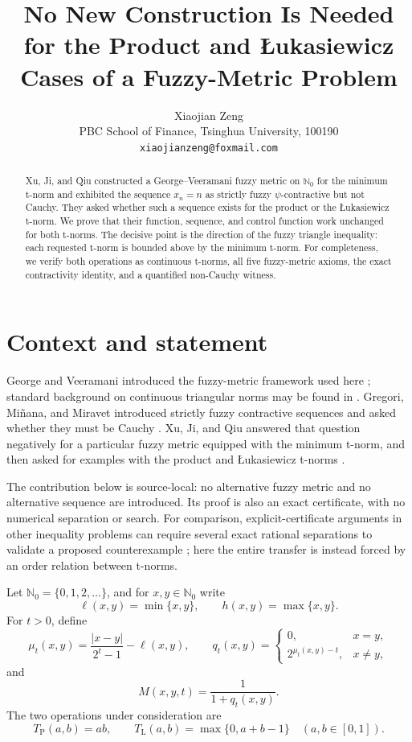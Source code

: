 \documentclass[11pt]{article}
\title{No New Construction Is Needed for the Product and
\L{}ukasiewicz Cases of a Fuzzy-Metric Problem}
\author{Xiaojian Zeng\\
PBC School of Finance, Tsinghua University, 100190\\
\texttt{xiaojianzeng@foxmail.com}}
\date{}
\newcommand{\Nzero}{\mathbb N_0}
\newcommand{\TP}{T_{\mathrm P}}
\newcommand{\TL}{T_{\mathrm L}}
\begin{document}
\maketitle

\begin{abstract}
Xu, Ji, and Qiu constructed a George--Veeramani fuzzy metric on
$\Nzero$ for the minimum t-norm and exhibited the sequence $x_n=n$ as
strictly fuzzy $\psi$-contractive but not Cauchy.  They asked whether such a
sequence exists for the product or the \L{}ukasiewicz t-norm.  We prove that
their function, sequence, and control function work unchanged for both
t-norms.  The decisive point is the direction of the fuzzy triangle
inequality: each requested t-norm is bounded above by the minimum t-norm.
For completeness, we verify both operations as continuous t-norms, all five
fuzzy-metric axioms, the exact contractivity identity, and a quantified
non-Cauchy witness.
\end{abstract}

\section{Context and statement}

George and Veeramani introduced the fuzzy-metric framework used here
\cite{GeorgeVeeramani1994}; standard background on continuous triangular
norms may be found in \cite{KlementMesiarPap2000}.  Gregori, Mi\~nana, and
Miravet introduced strictly fuzzy contractive sequences and asked whether
they must be Cauchy \cite{GregoriMinanaMiravet2020}.  Xu, Ji, and Qiu answered
that question negatively for a particular fuzzy metric equipped with the
minimum t-norm, and then asked for examples with the product and
\L{}ukasiewicz t-norms \cite[Problem~3]{XuJiQiu2026}.

The contribution below is source-local: no alternative fuzzy metric and no
alternative sequence are introduced.  Its proof is also an exact certificate,
with no numerical separation or search.  For comparison, explicit-certificate
arguments in other inequality problems can require several exact rational
separations to validate a proposed counterexample
\cite{ZengLiuRatnavelu2026}; here the entire transfer is instead forced by an
order relation between t-norms.

Let $\Nzero=\{0,1,2,\ldots\}$, and for $x,y\in\Nzero$ write
\[
 \ell(x,y)=\min\{x,y\},\qquad h(x,y)=\max\{x,y\}.
\]
For $t>0$, define
\[
 \mu_t(x,y)=\frac{|x-y|}{2^t-1}-\ell(x,y),
 \qquad
 q_t(x,y)=
 \begin{cases}
  0,&x=y,\\
  2^{\mu_t(x,y)-t},&x\ne y,
 \end{cases}
\]
and
\[
 M(x,y,t)=\frac{1}{1+q_t(x,y)}.
\]
The two operations under consideration are
\[
 \TP(a,b)=ab,
 \qquad
 \TL(a,b)=\max\{0,a+b-1\}
 \quad (a,b\in[0,1]).
\]
\end{document}
